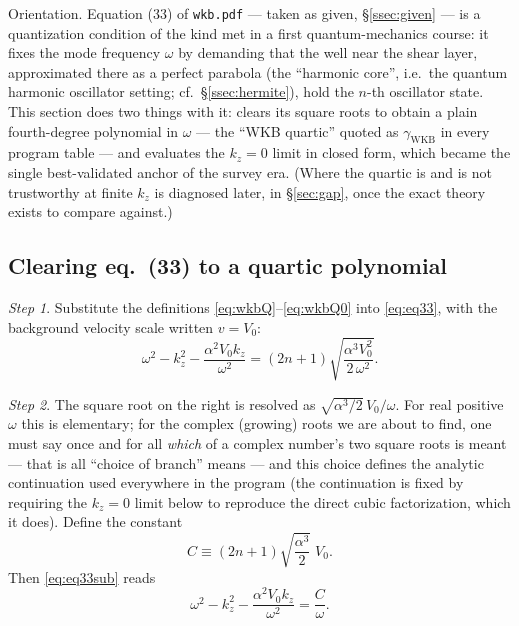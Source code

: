 \documentclass[11pt,a4paper]{article}
\numberwithin{equation}{section}
\theoremstyle{remark}
\newtheorem{step}{Step}[subsection]
\newcommand{\Vo}{V_0}
\newcommand{\kz}{k_z}
\begin{document}
Orientation. Equation (33) of \texttt{wkb.pdf} --- taken as given,
\S\ref{ssec:given} --- is a quantization condition of the kind met in a
first quantum-mechanics course: it fixes the mode frequency $\omega$ by
demanding that the well near the shear layer, approximated there as a
perfect parabola (the ``harmonic core'', i.e.\ the quantum harmonic
oscillator setting; cf.\ \S\ref{ssec:hermite}), hold the $n$-th
oscillator state. This section does two things with it: clears its
square roots to obtain a plain fourth-degree polynomial in $\omega$ ---
the ``WKB quartic'' quoted as $\gamma_{\mathrm{WKB}}$ in every program
table --- and evaluates the $\kz=0$ limit in closed form, which became
the single best-validated anchor of the survey era. (Where the quartic
is and is not trustworthy at finite $\kz$ is diagnosed later, in
\S\ref{sec:gap}, once the exact theory exists to compare against.)

\subsection{Clearing eq.~(33) to a quartic polynomial}
\label{ssec:clearing}

\begin{step}
Substitute the definitions \eqref{eq:wkbQ}--\eqref{eq:wkbQ0} into
\eqref{eq:eq33}, with the background velocity scale written $v=\Vo$:
\begin{equation}
\omega^2-\kz^2-\frac{\alpha^2\Vo\kz}{\omega^2}
=(2n+1)\sqrt{\frac{\alpha^3\Vo^2}{2\,\omega^2}} .
\label{eq:eq33sub}
\end{equation}
\end{step}

\begin{step}
The square root on the right is resolved as
$\sqrt{\alpha^3/2}\,\Vo/\omega$. For real positive $\omega$ this is
elementary; for the complex (growing) roots we are about to find, one
must say once and for all \emph{which} of a complex number's two square
roots is meant --- that is all ``choice of branch'' means --- and this
choice defines the analytic continuation used everywhere in the
program (the continuation is fixed by requiring the $\kz=0$ limit below to
reproduce the direct cubic factorization, which it does). Define the
constant
\begin{equation}
C\equiv(2n+1)\sqrt{\frac{\alpha^3}{2}}\;\Vo .
\label{eq:Cdef}
\end{equation}
Then \eqref{eq:eq33sub} reads
\begin{equation}
\omega^2-\kz^2-\frac{\alpha^2\Vo\kz}{\omega^2}=\frac{C}{\omega}.
\end{equation}
\end{step}
\end{document}
